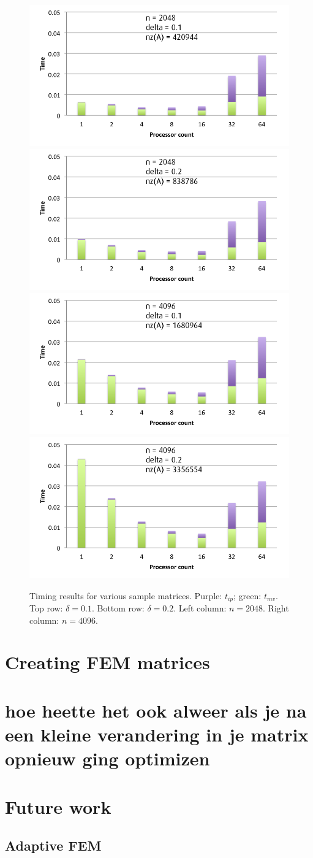 \documentclass[11pt]{amsart}
\theoremstyle{definition}
\begin{document}
\begin{figure}
  \includegraphics[width=0.48\linewidth]{n2048d0_1mvip.png}
  \includegraphics[width=0.48\linewidth]{n2048d0_2mvip.png}
  \includegraphics[width=0.48\linewidth]{n4096d0_1mvip.png}
  \includegraphics[width=0.48\linewidth]{n4096d0_2mvip.png}
  \caption{Timing results for various sample matrices. Purple: $t_{ip}$; green: $t_{mv}$. Top row: $\delta = 0.1$. Bottom row: $\delta = 0.2$. Left column: $n = 2048$. Right column: $n = 4096$.}
  \label{fig:samples}
\end{figure}

\section{Creating FEM matrices}
\section{hoe heette het ook alweer als je na een kleine verandering in je matrix opnieuw ging optimizen}

\section{Future work}
\subsection{Adaptive FEM}




\end{document}
